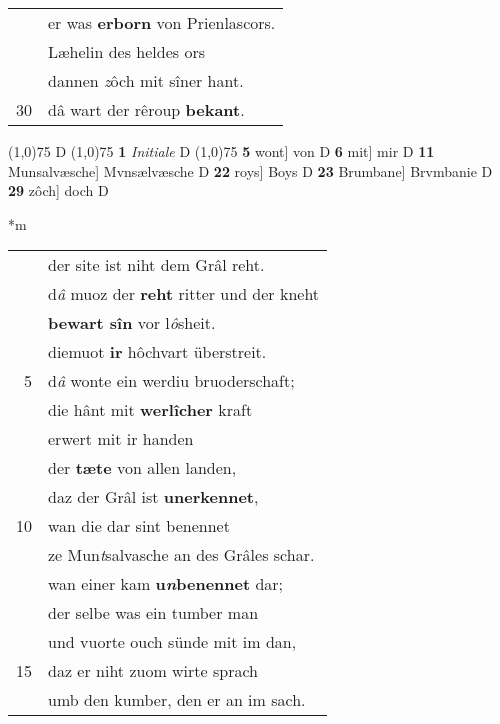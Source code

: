 \documentclass[8pt,a4paper,notitlepage]{article}
\begin{document}
\begin{table}[ht]
\begin{minipage}[t]{0.5\linewidth}
\begin{tabular}{rl}
 & er was \textbf{erborn} von Prienlascors.\\ 
 & Læhelin des heldes ors\\ 
 & dannen \textit{z}ôch mit sîner hant.\\ 
30 & dâ wart der rêroup \textbf{bekant}.\\ 
\end{tabular}
\scriptsize
\line(1,0){75} \newline
D \newline
\line(1,0){75} \newline
\textbf{1} \textit{Initiale} D  \newline
\line(1,0){75} \newline
\textbf{5} wont] von D \textbf{6} mit] mir D \textbf{11} Munsalvæsche] Mvnsælvæsche D \textbf{22} roys] Boys D \textbf{23} Brumbane] Brvmbanie D \textbf{29} zôch] doch D \newline
\end{minipage}
\hspace{0.5cm}
\begin{minipage}[t]{0.5\linewidth}
\small
\begin{center}*m
\end{center}
\begin{tabular}{rl}
 & der site ist niht dem Grâl reht.\\ 
 & d\textit{â} muoz der \textbf{reht} ritter und der kneht\\ 
 & \textbf{bewart sîn} vor l\textit{ô}sheit.\\ 
 & diemuot \textbf{ir} hôchvart überstreit.\\ 
5 & d\textit{â} wonte ein werdiu bruoderschaft;\\ 
 & die hânt mit \textbf{werlîcher} kraft\\ 
 & erwert mit ir handen\\ 
 & der \textbf{tæte} von allen landen,\\ 
 & daz der Grâl ist \textbf{unerkennet},\\ 
10 & wan die dar sint benennet\\ 
 & ze Mun\textit{t}salvasche an des Grâles schar.\\ 
 & wan einer kam \textbf{u\textit{n}benennet} dar;\\ 
 & der selbe was ein tumber man\\ 
 & und vuorte ouch sünde mit im dan,\\ 
15 & daz er niht zuom wirte sprach\\ 
 & umb den kumber, den er an im sach.\\ 

\end{tabular}
\end{minipage}
\end{table}
\end{document}
